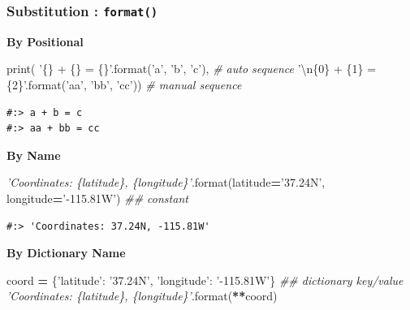 \documentclass[
]{book}
\newenvironment{Shaded}{\begin{snugshade}}{\end{snugshade}}
\newcommand{\BuiltInTok}[1]{#1}
\newcommand{\CharTok}[1]{\textcolor[rgb]{0.5,0.5,0.5}{#1}}
\newcommand{\CommentTok}[1]{\textcolor[rgb]{0.37,0.37,0.37}{\textit{#1}}}
\newcommand{\NormalTok}[1]{#1}
\newcommand{\OperatorTok}[1]{\textcolor[rgb]{0.43,0.43,0.43}{\textbf{#1}}}
\newcommand{\SpecialCharTok}[1]{\textcolor[rgb]{0,0,0}{#1}}
\newcommand{\StringTok}[1]{\textcolor[rgb]{0.5,0.5,0.5}{#1}}
\begin{document}
\hypertarget{substitution-format}{%
\subsubsection{\texorpdfstring{Substitution : \textbf{\texttt{format()}}}{Substitution : format()}}\label{substitution-format}}

\textbf{By Positional}

\begin{Shaded}
\begin{Highlighting}[]
\BuiltInTok{print}\NormalTok{( }\StringTok{'}\SpecialCharTok{\{\}}\StringTok{ + }\SpecialCharTok{\{\}}\StringTok{ = }\SpecialCharTok{\{\}}\StringTok{'}\NormalTok{.}\BuiltInTok{format}\NormalTok{(}\StringTok{'a'}\NormalTok{, }\StringTok{'b'}\NormalTok{, }\StringTok{'c'}\NormalTok{),         }\CommentTok{# auto sequence}
       \StringTok{'}\CharTok{\textbackslash{}n}\SpecialCharTok{\{0\}}\StringTok{ + }\SpecialCharTok{\{1\}}\StringTok{ = }\SpecialCharTok{\{2\}}\StringTok{'}\NormalTok{.}\BuiltInTok{format}\NormalTok{(}\StringTok{'aa'}\NormalTok{, }\StringTok{'bb'}\NormalTok{, }\StringTok{'cc'}\NormalTok{)) }\CommentTok{# manual sequence}
\end{Highlighting}
\end{Shaded}

\begin{verbatim}
#:> a + b = c 
#:> aa + bb = cc
\end{verbatim}

\textbf{By Name}

\begin{Shaded}
\begin{Highlighting}[]
\CommentTok{'Coordinates: \{latitude\}, \{longitude\}'}\NormalTok{.}\BuiltInTok{format}\NormalTok{(latitude}\OperatorTok{=}\StringTok{'37.24N'}\NormalTok{, longitude}\OperatorTok{=}\StringTok{'-115.81W'}\NormalTok{) }\CommentTok{## constant}
\end{Highlighting}
\end{Shaded}

\begin{verbatim}
#:> 'Coordinates: 37.24N, -115.81W'
\end{verbatim}

\textbf{By Dictionary Name}

\begin{Shaded}
\begin{Highlighting}[]
\NormalTok{coord }\OperatorTok{=}\NormalTok{ \{}\StringTok{'latitude'}\NormalTok{: }\StringTok{'37.24N'}\NormalTok{, }\StringTok{'longitude'}\NormalTok{: }\StringTok{'-115.81W'}\NormalTok{\} }\CommentTok{## dictionary key/value}
\CommentTok{'Coordinates: \{latitude\}, \{longitude\}'}\NormalTok{.}\BuiltInTok{format}\NormalTok{(}\OperatorTok{**}\NormalTok{coord)}
\end{Highlighting}
\end{Shaded}
\end{document}
